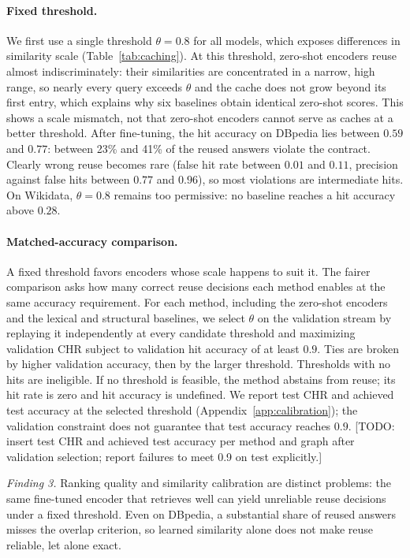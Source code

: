 \documentclass[runningheads]{llncs}
\newcommand{\hp}[1]{{\color{red!75!black}#1}}
\begin{document}
\paragraph{Fixed threshold.}
We first use a single threshold $\theta = 0.8$ for all models, which exposes
differences in similarity scale (Table~\ref{tab:caching}). At this threshold,
zero-shot encoders reuse almost indiscriminately: their similarities are
concentrated in a narrow, high range, so nearly every query exceeds $\theta$
and the cache does not grow beyond its first entry, which explains why six
baselines obtain identical zero-shot scores. This shows a scale mismatch, not
that zero-shot encoders cannot serve as caches at a better threshold. After
fine-tuning, the hit accuracy on DBpedia lies between $0.59$ and $0.77$: between
23\% and 41\% of the reused answers violate the contract. Clearly wrong reuse
becomes rare (false hit rate between $0.01$ and $0.11$, precision against false
hits between $0.77$ and $0.96$), so most violations are intermediate hits. On
Wikidata, $\theta = 0.8$ remains too permissive: no baseline reaches a hit
accuracy above $0.28$.

\paragraph{Matched-accuracy comparison.}
A fixed threshold favors encoders whose scale happens to suit it. The fairer
comparison asks how many correct reuse decisions each method enables at the
same accuracy requirement. For each method, including the zero-shot encoders
and the lexical and structural baselines, we select $\theta$ on the validation
stream by replaying it independently at every candidate threshold and
maximizing validation CHR subject to validation hit accuracy of at least $0.9$.
Ties are broken by higher validation accuracy, then by the larger threshold.
Thresholds with no hits are ineligible. If no threshold is feasible, the
method abstains from reuse; its hit rate is zero and hit accuracy is undefined.
We report test CHR and achieved test accuracy at the selected threshold
(Appendix~\ref{app:calibration}); the validation constraint does not guarantee
that test accuracy reaches $0.9$.
\hp{[TODO: insert test CHR and achieved test accuracy per method and graph
after validation selection; report failures to meet 0.9 on test explicitly.]}

\textit{Finding 3.} Ranking quality and similarity calibration are distinct
problems: the same fine-tuned encoder that retrieves well can yield unreliable
reuse decisions under a fixed threshold. Even on DBpedia, a substantial share
of reused answers misses the overlap criterion, so learned similarity alone
does not make reuse reliable, let alone exact.
\end{document}
